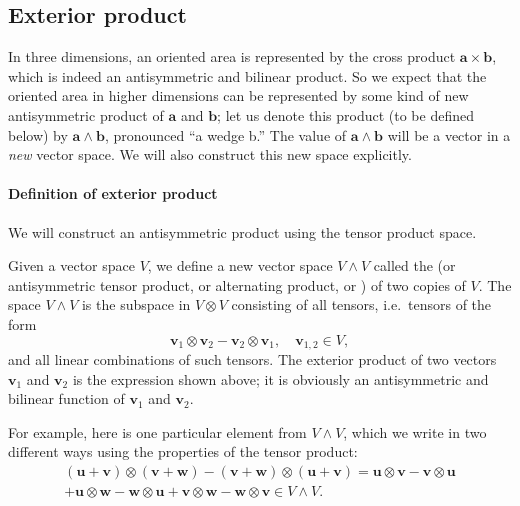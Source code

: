 \subsection{Exterior product\label{sub:Definition-of-the-exterior}}


In three dimensions, an oriented area is represented by the cross
product $\mathbf{a}\times\mathbf{b}$, which is indeed an antisymmetric
and bilinear product. So we expect that the oriented area in higher
dimensions can be represented by some kind of new antisymmetric product
of $\mathbf{a}$ and $\mathbf{b}$; let us denote this product (to
be defined below) by $\mathbf{a}\wedge\mathbf{b}$, pronounced {}``a
wedge b.'' The value of $\mathbf{a}\wedge\mathbf{b}$ will be a vector
in a \emph{new} vector space. We will also construct this new space
explicitly.


\paragraph{Definition of exterior product}

We
will construct an antisymmetric product  using the
tensor product space.


\begin{df}
Given a vector space $V$, we define a new vector space $V\wedge V$
called the  (or
antisymmetric tensor product, or alternating product, or ) of two copies of $V$. The space $V\wedge V$
is the subspace in $V\otimes V$ consisting of all 
tensors, i.e.~tensors of the form\[
\mathbf{v}_{1}\otimes\mathbf{v}_{2}-\mathbf{v}_{2}\otimes\mathbf{v}_{1},\quad\mathbf{v}_{1,2}\in V,\]
and all linear combinations of such tensors. The exterior product
of two vectors $\mathbf{v}_{1}$ and $\mathbf{v}_{2}$ is the expression
shown above; it is obviously an antisymmetric and bilinear function
of $\mathbf{v}_{1}$ and $\mathbf{v}_{2}$.
\end{df}

For example, here is one particular element from $V\wedge V$, which
we write in two different ways using the properties of the tensor product:\begin{align}
\left(\mathbf{u}+\mathbf{v}\right)\otimes\left(\mathbf{v}+\mathbf{w}\right)-\left(\mathbf{v}+\mathbf{w}\right)\otimes\left(\mathbf{u}+\mathbf{v}\right)=\mathbf{u}\otimes\mathbf{v}-\mathbf{v}\otimes\mathbf{u}\nonumber \\
+\mathbf{u}\otimes\mathbf{w}-\mathbf{w}\otimes\mathbf{u}+\mathbf{v}\otimes\mathbf{w}-\mathbf{w}\otimes\mathbf{v}\in V\wedge V.\label{eq:uvw calc 1}\end{align}



